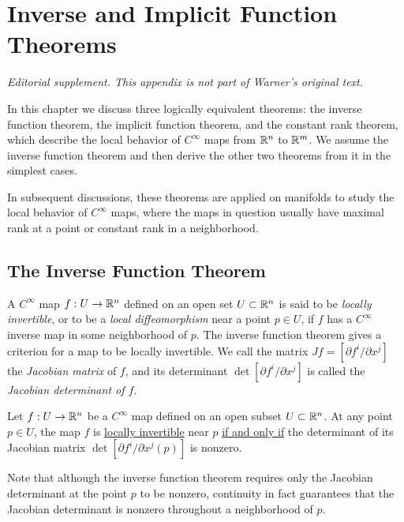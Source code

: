 \chapter{Inverse and Implicit Function Theorems}
\label{sec:inverse-function-theorem}
\noindent\emph{Editorial supplement. This appendix is not part of Warner's original text.}
\medskip

In this chapter we discuss three logically equivalent theorems: the inverse
function theorem, the implicit function theorem, and the constant rank
theorem, which describe the local behavior of $C^\infty$ maps from $\mathbb R^n$ to
$\mathbb R^m$. We assume the inverse function theorem and then derive the other two
theorems from it in the simplest cases.


In subsequent discussions, these theorems are applied on manifolds to study
the local behavior of $C^\infty$ maps, where the maps in question usually have
maximal rank at a point or constant rank in a neighborhood.


\section{The Inverse Function Theorem}

A $C^\infty$ map $f: U\to \mathbb R^n$ defined on an open set $U\subset\mathbb R^n$ is
said to be \emph{locally invertible}, or to be a \emph{local diffeomorphism}
near a point $p\in U$, if $f$ has a $C^\infty$ inverse map in some
neighborhood of $p$. The inverse function theorem gives a criterion for a map
to be locally invertible. We call the matrix $Jf = [\partial f^i/\partial
	x^j]$ the \emph{Jacobian matrix} of $f$, and its determinant $\det
	[\partial f^i/\partial x^j]$ is called the \emph{Jacobian determinant of
	$f$}.

\begin{theorem}
  \label{thm:inverse-function-theorem-Rn}

	Let $f:U\to\mathbb R^n$ be a $C^\infty$ map defined on an open subset
	$U\subset\mathbb R^n$. At any point $p\in U$, the map $f$ is
	\underline{locally invertible} near $p$ \underline{if and only if} the
	determinant of its Jacobian matrix $\det [\partial f^i/\partial x^j
			(p)]$ is nonzero.

\end{theorem}

Note that although the inverse function theorem requires only the Jacobian
determinant at the point $p$ to be nonzero, continuity in fact guarantees
that the Jacobian determinant is nonzero throughout a neighborhood of $p$.


